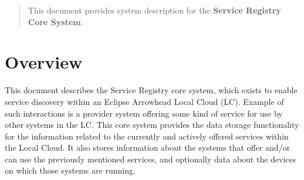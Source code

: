 \documentclass[a4paper]{arrowhead}
\begin{document}
\ArrowheadDate{\today}
\ArrowheadSetup

\begin{center}
  \vspace*{1cm}
  \huge{\arrowtitle}

  \vspace*{0.2cm}
  \LARGE{\arrowtype}
  \vspace*{1cm}

  \vspace*{\fill}


  \vspace*{1cm}
  \vspace*{\fill}

  \begin{abstract}
    This document provides system description for the \textbf{Service Registry Core System}.
  \end{abstract}

  \vspace*{1cm}

 \end{center}

\newpage

\tableofcontents
\newpage

\section{Overview}
\label{sec:overview}
\color{black}
This document describes the Service Registry core system, which exists to enable service discovery within an Eclipse Arrowhead Local Cloud (LC). Example of such interactions is a provider system offering some kind of service for use by other systems in the LC. This core system provides the data storage functionality for the information related to the currently and actively offered services within the Local Cloud. It also stores information about the systems that offer and/or can use the previously mentioned services, and optionally data about the devices on which those systems are running.
\end{document}
